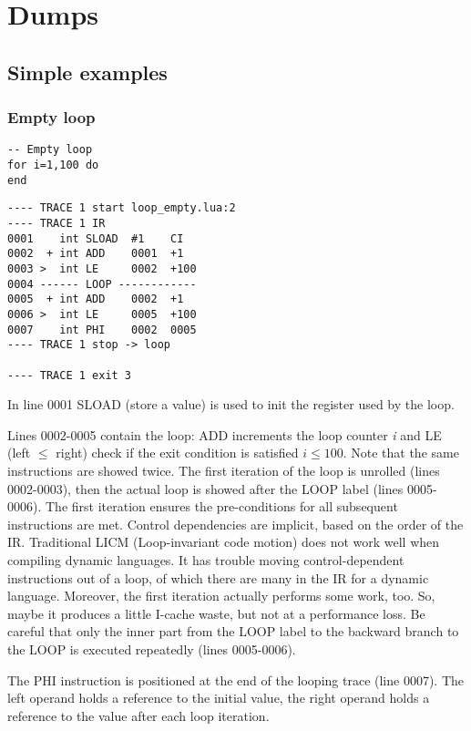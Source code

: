 \chapter{Dumps}

\section{Simple examples}

\subsection{Empty loop}

\begin{lstlisting}[style=LuaStyle]
-- Empty loop
for i=1,100 do
end
\end{lstlisting}

\begin{lstlisting}[style=DumpStyle]
---- TRACE 1 start loop_empty.lua:2
---- TRACE 1 IR
0001    int SLOAD  #1    CI
0002  + int ADD    0001  +1  
0003 >  int LE     0002  +100
0004 ------ LOOP ------------
0005  + int ADD    0002  +1  
0006 >  int LE     0005  +100
0007    int PHI    0002  0005
---- TRACE 1 stop -> loop

---- TRACE 1 exit 3
\end{lstlisting}

In line 0001 SLOAD (store a value) is used to init the register used by the loop. 

Lines 0002-0005 contain the loop: ADD increments the loop counter \textit{i} and LE (left $\leq$ right) check if the exit condition is satisfied $i\leq100$. Note that the same instructions are showed twice. The first iteration of the loop is unrolled (lines 0002-0003), then the actual loop is showed after the LOOP label (lines 0005-0006). The first iteration ensures the pre-conditions for all subsequent instructions are met. Control dependencies are implicit, based on
the order of the IR. Traditional LICM (Loop-invariant code motion) does not work well when compiling dynamic languages. It has trouble moving control-dependent instructions out of a loop, of which there are many in the IR for a dynamic language. Moreover, the first iteration actually performs some work, too. So, maybe it produces a little I-cache waste, but not at a performance loss. Be careful that only the inner part from the LOOP label to the backward branch to the LOOP is executed repeatedly (lines 0005-0006).

The PHI instruction is  positioned at the end of the looping trace (line 0007). The left operand holds a reference to the initial value, the right operand holds a reference to the value after each loop iteration.

